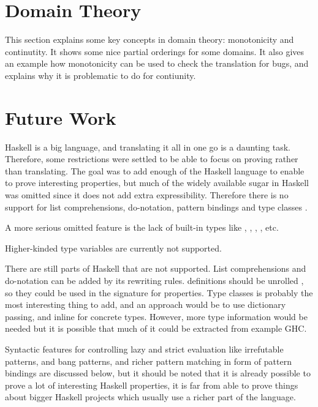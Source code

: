 %


\section{Domain Theory}

This section explains some key concepts in domain theory: monotonicity
and continutity. It shows some nice partial orderings for some
domains. It also gives an example how monotonicity can be used to
check the translation for bugs, and explains why it is problematic to
do for contiunity.

\section{Future Work}

Haskell is a big language, and translating it all in one go is a
daunting task. Therefore, some restrictions were settled to be able to
focus on proving rather than translating.    The goal was to add enough of the Haskell language to
enable to prove interesting properties, but much of the widely
available sugar in Haskell was omitted since it does not add extra
expressibility. Therefore there is no support for list comprehensions,
do-notation, pattern bindings and type classes .

A more serious omitted feature is the lack of built-in types like ,
, , , etc.

Higher-kinded type variables are currently not supported.

There are still parts of Haskell that are not supported. List
comprehensions and do-notation can be added by its rewriting rules.
 definitions should be unrolled , so they could be used in
the signature for properties. Type classes is probably the most
interesting thing to add, and an approach would be to use dictionary
passing, and inline for concrete types. However, more type information
would be needed but it is possible that much of it could be extracted
from example GHC.

Syntactic features for controlling lazy and strict evaluation like
irrefutable patterns,  and bang patterns, and richer pattern
matching in form of pattern bindings are discussed below, but it
should be noted that it is already possible to prove a lot of
interesting Haskell properties, it is far from able to prove things
about bigger Haskell projects which usually use a richer part of the
language.

